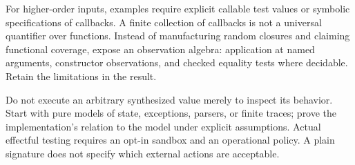 For higher-order inputs, examples require explicit callable test values or symbolic specifications of callbacks. A finite collection of callbacks is not a universal quantifier over functions. Instead of manufacturing random closures and claiming functional coverage, expose an observation algebra: application at named arguments, constructor observations, and checked equality tests where decidable. Retain the limitations in the result.

Do not execute an arbitrary synthesized  value merely to inspect its behavior. Start with pure models of state, exceptions, parsers, or finite traces; prove the implementation's relation to the model under explicit assumptions. Actual effectful testing requires an opt-in sandbox and an operational policy. A plain  signature does not specify which external actions are acceptable.
